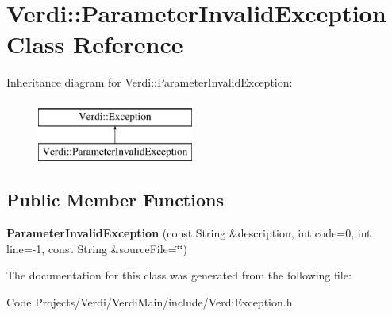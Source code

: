 \hypertarget{class_verdi_1_1_parameter_invalid_exception}{\section{\-Verdi\-:\-:\-Parameter\-Invalid\-Exception \-Class \-Reference}
\label{class_verdi_1_1_parameter_invalid_exception}
}
\-Inheritance diagram for \-Verdi\-:\-:\-Parameter\-Invalid\-Exception\-:\begin{figure}[H]
\begin{center}
\leavevmode
\includegraphics[height=2.000000cm]{class_verdi_1_1_parameter_invalid_exception}
\end{center}
\end{figure}
\subsection*{\-Public \-Member \-Functions}
\begin{DoxyCompactItemize}
\item 
\hypertarget{class_verdi_1_1_parameter_invalid_exception_a7e1e7ca3e70b5ac4007ae798aad071ed}{{\bfseries \-Parameter\-Invalid\-Exception} (const \-String \&description, int code=0, int line=-\/1, const \-String \&source\-File=\char`\"{}\char`\"{})}\label{class_verdi_1_1_parameter_invalid_exception_a7e1e7ca3e70b5ac4007ae798aad071ed}

\end{DoxyCompactItemize}


\-The documentation for this class was generated from the following file\-:\begin{DoxyCompactItemize}
\item 
\-Code Projects/\-Verdi/\-Verdi\-Main/include/\-Verdi\-Exception.\-h\end{DoxyCompactItemize}

